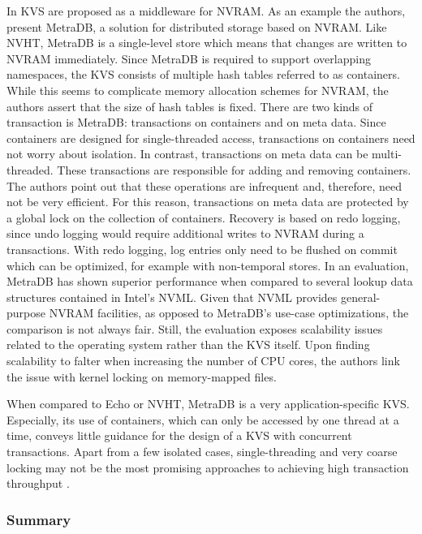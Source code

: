 In \cite{marmol2016nonvolatile} KVS are proposed as a middleware for NVRAM. As
an example the authors, present MetraDB, a solution for distributed storage
based on NVRAM. Like NVHT, MetraDB is a single-level store which means that
changes are written to NVRAM immediately. Since MetraDB is required to support
overlapping namespaces, the KVS consists of multiple hash tables referred to as
containers. While this seems to complicate memory allocation schemes for NVRAM,
the authors assert that the size of hash tables is fixed. There are two kinds of
transaction is MetraDB: transactions on containers and on meta data. Since
containers are designed for single-threaded access, transactions on containers
need not worry about isolation. In contrast, transactions on meta data can be
multi-threaded. These transactions are responsible for adding and removing
containers. The authors point out that these operations are infrequent and,
therefore, need not be very efficient. For this reason, transactions on meta
data are protected by a global lock on the collection of containers. Recovery is
based on redo logging, since undo logging would require additional writes to
NVRAM during a transactions. With redo logging, log entries only need to be
flushed on commit which can be optimized, for example with non-temporal stores.
In an evaluation, MetraDB has shown superior performance when compared to
several lookup data structures contained in Intel's NVML. Given that NVML
provides general-purpose NVRAM facilities, as opposed to MetraDB's use-case
optimizations, the comparison is not always fair. Still, the evaluation exposes
scalability issues related to the operating system rather than the KVS itself.
Upon finding scalability to falter when increasing the number of CPU cores, the
authors link the issue with kernel locking on memory-mapped files.

When compared to Echo or NVHT, MetraDB is a very application-specific KVS.
Especially, its use of containers, which can only be accessed by one thread at a
time, conveys little guidance for the design of a KVS with concurrent
transactions. Apart from a few isolated cases, single-threading and very coarse
locking may not be the most promising approaches to achieving high transaction
throughput \cite{molina1992main}.

\subsubsection{Summary}



